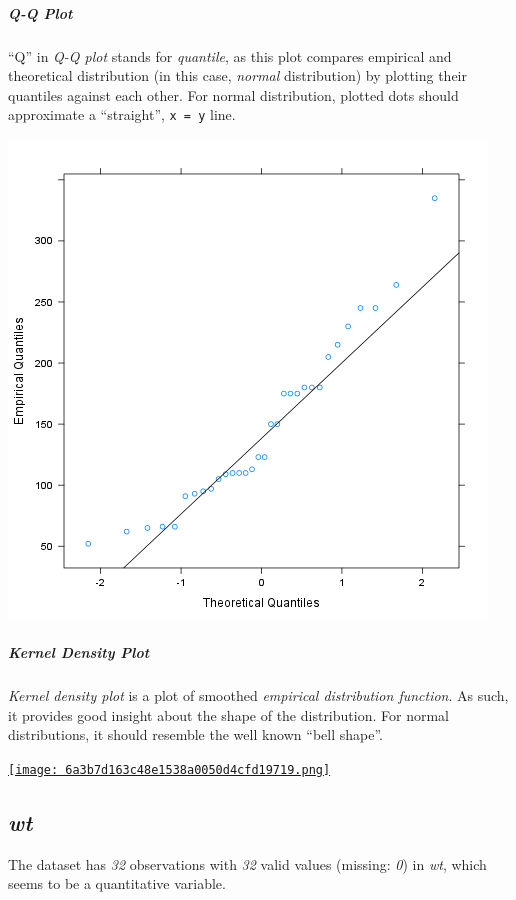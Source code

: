 \documentclass[]{article}
\makeatletter
\def\maxwidth{\ifdim\Gin@nat@width>\linewidth\linewidth
\else\Gin@nat@width\fi}
\let\Oldincludegraphics\includegraphics
\renewcommand{\includegraphics}[1]{\Oldincludegraphics[width=\maxwidth]{#1}}
\makeatother
\begin{document}
\subparagraph{Q-Q Plot}

``Q'' in \emph{Q-Q plot} stands for \emph{quantile}, as this plot
compares empirical and theoretical distribution (in this case,
\emph{normal} distribution) by plotting their quantiles against each
other. For normal distribution, plotted dots should approximate a
``straight'', \texttt{x = y} line.

\href{1cefec04e4451a937a5c6aa4dfdcb352-hires.png}{\includegraphics{1cefec04e4451a937a5c6aa4dfdcb352.png}}

\subparagraph{Kernel Density Plot}

\emph{Kernel density plot} is a plot of smoothed \emph{empirical
distribution function}. As such, it provides good insight about the
shape of the distribution. For normal distributions, it should resemble
the well known ``bell shape''.

\href{6a3b7d163c48e1538a0050d4cfd19719-hires.png}{\texttt{[image: 6a3b7d163c48e1538a0050d4cfd19719.png]}}

\subsection{\emph{wt}}

The dataset has \emph{32} observations with \emph{32} valid values
(missing: \emph{0}) in \emph{wt}, which seems to be a quantitative
variable.
\end{document}
